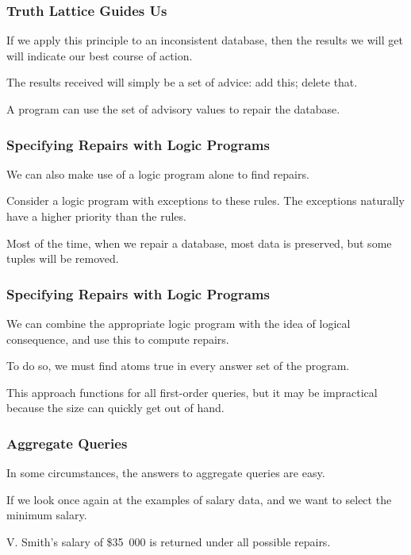 \begin{frame}
\frametitle{Truth Lattice Guides Us}

If we apply this principle to an inconsistent database, then the results we will get will indicate our best course of action. 

The results received will simply be a set of advice: add this; delete that.

A program can use the set of advisory values to repair the database.


\end{frame}


\begin{frame}
\frametitle{Specifying Repairs with Logic Programs}

We can also make use of a logic program alone to find repairs.

Consider a logic program with exceptions to these rules. The exceptions naturally have a higher priority than the rules.

Most of the time, when we repair a database, most data is preserved, but some tuples will be removed. 

\end{frame}


\begin{frame}
\frametitle{Specifying Repairs with Logic Programs}

We can combine the appropriate logic program with the idea of logical consequence, and use this to compute repairs.

To do so, we must find atoms true in every answer set of the program. 

This approach functions for all first-order queries, but it may be impractical because the size can quickly get out of hand.

\end{frame}

\begin{frame}
\frametitle{Aggregate Queries}

In some circumstances, the answers to aggregate queries are easy. 

If we look once again at the examples of salary data, and we want to select the minimum salary. 

V. Smith's salary of \$35~000 is returned under all possible repairs. 

\end{frame}

